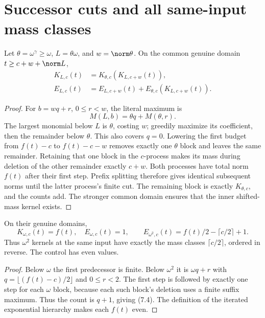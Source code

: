 \documentclass[11pt,a4paper]{article}
\newcommand{\KK}[2]{K_{#1,#2}}
\newcommand{\EE}[2]{E_{#1,#2}}
\begin{document}
\section{Successor cuts and all same-input mass classes}
\begin{lemma}\label{lem:successor}
Let $\theta=\omega^\gamma\ge\omega$, $L=\theta\omega$, and
$w=\norm\theta$. On the common genuine domain $t\ge c+w+\norm L$,
\begin{align}
 \KK Lc(t)&=\KK\theta c(\KK L{c+w}(t)),              \label{eq:cut}\\
 \EE Lc(t)&=\EE L{c+w}(t)
        +\EE\theta c(\KK L{c+w}(t)).                \label{eq:cocycle}
\end{align}
\end{lemma}
\begin{proof}
For $b=wq+r$, $0\le r<w$, the literal maximum is
\[
                   M(L,b)=\theta q+M(\theta,r).      \tag{7.3}
\]
The largest monomial below $L$ is $\theta$, costing $w$; greedily maximize
its coefficient, then the remainder below $\theta$. This also covers
$q=0$. Lowering the first budget from $f(t)-c$ to $f(t)-c-w$ removes
exactly one $\theta$ block and leaves the same remainder. Retaining that
one block in the $c$-process makes its mass during deletion of the other
remainder exactly $c+w$. Both processes have total norm $f(t)$ after
their first step. Prefix splitting therefore gives identical subsequent
norms until the latter process's finite cut. The remaining block is
exactly $\KK\theta c$, and the counts add. The stronger common domain
ensures that the inner shifted-mass kernel exists.
\end{proof}

\begin{lemma}\label{lem:small}
On their genuine domains,
\[
 \KK\omega c(t)=f(t),\quad\EE\omega c(t)=1,\qquad
 \EE{\omega^2}c(t)=f(t)/2-\lceil c/2\rceil+1.         \tag{7.4}
\]
Thus $\omega^2$ kernels at the same input have exactly the mass classes
$\lceil c/2\rceil$, ordered in reverse. The control has even values.
\end{lemma}
\begin{proof}
Below $\omega$ the first predecessor is finite. Below $\omega^2$ it is
$\omega q+r$ with $q=\lfloor(f(t)-c)/2\rfloor$ and $0\le r<2$.
The first step is followed by exactly one step for each $\omega$ block,
because each such block's deletion uses a finite suffix maximum. Thus
the count is $q+1$, giving (7.4). The definition of the iterated
exponential hierarchy makes each $f(t)$ even.
\end{proof}
\end{document}
